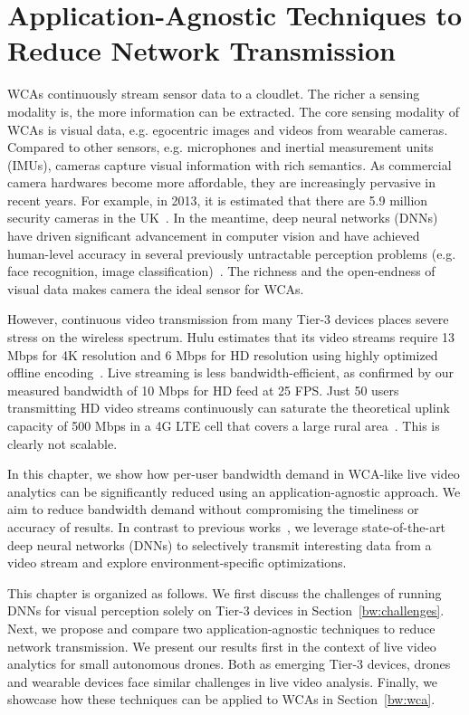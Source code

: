 \chapter{Application-Agnostic Techniques to Reduce Network Transmission}
\label{chapter: bandwidth}

WCAs continuously stream sensor data to a cloudlet. The richer a sensing
modality is, the more information can be extracted. The core sensing modality of
WCAs is visual data, e.g. egocentric images and videos from wearable cameras.
Compared to other sensors, e.g. microphones and inertial measurement units
(IMUs), cameras capture visual information with rich semantics. As commercial
camera hardwares become more affordable, they are increasingly pervasive in
recent years. For example, in 2013, it is estimated that there are 5.9 million
security cameras in the UK~\cite{Barrett2013}. In the meantime, deep neural
networks (DNNs) have driven significant advancement in computer vision and have
achieved human-level accuracy in several previously untractable perception
problems (e.g. face recognition, image classification)~\cite{learned2016labeled,
schroff2015facenet}. The richness and the open-endness of visual data makes
camera the ideal sensor for WCAs.

However, continuous video transmission from many Tier-3 devices places severe
stress on the wireless spectrum.  Hulu estimates that its video streams require
13 Mbps for 4K resolution and 6 Mbps for HD resolution using highly optimized
offline encoding~\cite{Hulu2017}. Live streaming is less bandwidth-efficient, as
confirmed by our measured bandwidth of 10 Mbps for HD feed at 25 FPS. Just 50
users transmitting HD video streams continuously can saturate the theoretical
uplink capacity of 500 Mbps in a 4G LTE cell that covers a large rural
area~\cite{LteWorld2009}.  This is clearly not scalable.

In this chapter, we show how per-user bandwidth demand in WCA-like live video
analytics can be significantly reduced using an application-agnostic approach.
We aim to reduce bandwidth demand without compromising the timeliness or
accuracy of results. In contrast to previous
works~\cite{Wang2017networked,zhang2015design,Wang2016skyeyes}, we leverage
state-of-the-art deep neural networks (DNNs) to selectively transmit interesting
data from a video stream and explore environment-specific optimizations. 

This chapter is organized as follows. We first discuss the challenges of running
DNNs for visual perception solely on Tier-3 devices in
Section~\ref{bw:challenges}. Next, we propose and compare two
application-agnostic techniques to reduce network transmission. We present our
results first in the context of live video analytics for small autonomous
drones. Both as emerging Tier-3 devices, drones and wearable devices face
similar challenges in live video analysis. Finally, we showcase how these
techniques can be applied to WCAs in Section~\ref{bw:wca}.

